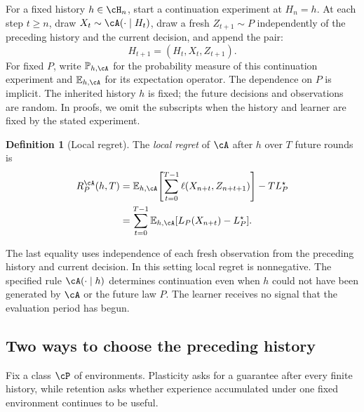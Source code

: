 \documentclass[11pt,twoside]{article}
\newcommand{\E}{\mathbb E}
\renewcommand{\P}{\mathbb P}
\theoremstyle{definition}
\newtheorem{definition}[theorem]{Definition}
\theoremstyle{remark}
\begin{document}
For a fixed history $h\in\cH_n$, start a continuation experiment at
$H_n=h$. At each step $t\ge n$, draw
$X_t\sim\cA(\cdot\mid H_t)$, draw a fresh $Z_{t+1}\sim P$
independently of the preceding history and the current decision, and
append the pair:
\[
 H_{t+1}=(H_t,X_t,Z_{t+1}).
\]
For fixed $P$, write $\P_{h,\cA}$ for the probability measure of this
continuation experiment and $\E_{h,\cA}$ for its expectation operator.
The dependence on $P$ is implicit. The inherited history $h$ is fixed;
the future decisions and observations are random.
In proofs, we omit the subscripts when the history and learner are fixed
by the stated experiment.

\begin{definition}[Local regret]
\label{def:local}
The \emph{local regret} of $\cA$ after $h$ over $T$ future rounds is
\begin{equation}
 \begin{aligned}
 R_P^\cA(h,T)
 &=\E_{h,\cA}\!\left[\sum_{t=0}^{T-1}\ell(X_{n+t},Z_{n+t+1})\right]
       -T L_P^\star\\
 &=\sum_{t=0}^{T-1}\E_{h,\cA}[L_P(X_{n+t})-L_P^\star].
 \end{aligned}
 \label{eq:local}
\end{equation}
\end{definition}

The last equality uses independence of each fresh observation from the
preceding history and current decision. In this setting local regret is
nonnegative. The specified rule $\cA(\cdot\mid h)$ determines continuation
even when $h$ could not have been generated by $\cA$ or the future law $P$.
The learner receives no signal that the evaluation period has begun.

\subsection{Two ways to choose the preceding history}

Fix a class $\cP$ of environments. Plasticity asks for a guarantee after
every finite history, while retention asks whether experience accumulated
under one fixed environment continues to be useful.
\end{document}
